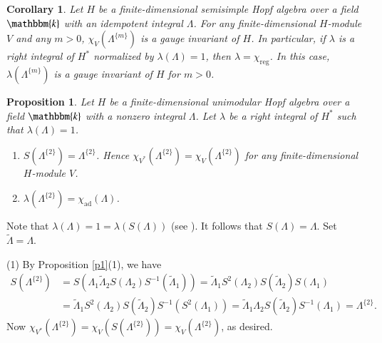 \documentclass[11pt]{amsart}
\newtheorem{cor}[thm]{Corollary}
\newtheorem{prop}[thm]{Proposition}
\numberwithin{equation}{section}
\begin{document}
\begin{cor}
Let $H$ be a finite-dimensional semisimple Hopf algebra over a field $\mathbbm{k}$ with an idempotent integral $\Lambda$. For any finite-dimensional $H$-module $V$ and any $m>0$, $\chi_{V}(\Lambda^{\{m\}})$ is a gauge invariant of $H$. In particular, if $\lambda$ is a right integral of $H^*$ normalized by $\lambda(\Lambda)=1$, then $\lambda=\chi_{\text{reg}}$. In this case, $\lambda(\Lambda^{\{m\}})$ is a gauge invariant of $H$ for $m>0$.
\end{cor}



\begin{prop}
Let $H$ be a finite-dimensional unimodular Hopf algebra over a field $\mathbbm{k}$ with a nonzero integral $\Lambda$. Let $\lambda$ be a right integral of $H^*$ such that $\lambda(\Lambda)=1$.
\begin{enumerate}
\item  $S(\Lambda^{\{2\}})=\Lambda^{\{2\}}$. Hence $\chi_{V^*}(\Lambda^{\{2\}})=\chi_V(\Lambda^{\{2\}})$ for any  finite-dimensional $H$-module $V$.
\item  $\lambda(\Lambda^{\{2\}})=\chi_{\operatorname{ad}}(\Lambda)$.
\end{enumerate}
\end{prop}
\proof
Note that $\lambda(\Lambda)=1=\lambda(S(\Lambda))$ (see \cite[Proposition 1(e)]{Rad}). It follows that $S(\Lambda)=\Lambda$. Set $\widetilde{\Lambda}=\Lambda$.

(1) By Proposition \ref{p1}(1), we have
\begin{align*}
S(\Lambda^{\{2\}})&=S(\Lambda_1\widetilde{\Lambda}_2S(\Lambda_2)S^{-1}(\widetilde{\Lambda}_1))=\widetilde{\Lambda}_1S^2(\Lambda_2)S(\widetilde{\Lambda}_2)S(\Lambda_1)\\
&=\widetilde{\Lambda}_1S^2(\Lambda_2)S(\widetilde{\Lambda}_2)S^{-1}(S^{2}(\Lambda_1))=\widetilde{\Lambda}_1\Lambda_2S(\widetilde{\Lambda}_2)S^{-1}(\Lambda_1)=\Lambda^{\{2\}}.
\end{align*}
Now $\chi_{V^*}(\Lambda^{\{2\}})=\chi_{V}(S(\Lambda^{\{2\}}))=\chi_{V}(\Lambda^{\{2\}})$, as desired. 
\end{document}
